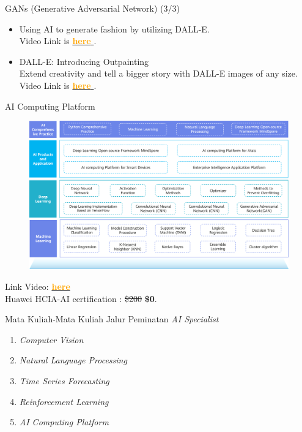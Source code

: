 \documentclass[pdf]{beamer}
\theoremstyle{mystyle}
\begin{document}
\begin{frame}{GANs (Generative Adversarial Network) (3/3)}
	\begin{itemize}
		\item Using AI to generate fashion by utilizing DALL-E. \\
		Video Link is \href{https://drive.google.com/file/d/1xrvBm1TKbGASN8CApdZkgL8sP5aXW2T_/view?usp=sharing}{\textcolor{orange}{\textbf{here}} }.
		
		\bigskip
		\item DALL-E: Introducing Outpainting \\
		Extend creativity and tell a bigger story with DALL-E images of any size. \\
		Video Link is \href{https://drive.google.com/file/d/1mJzmS_tayjQWHqwH9WyqvOdv9NGkOBMs/view?usp=share_link}{\textcolor{orange}{\textbf{here}} }.		
	\end{itemize}	
\end{frame}

\begin{frame}{AI Computing Platform}
	\begin{figure}[!ht]
		\centering
		\includegraphics[scale=.18]{images/peta-topik-huawei-ai}
	\end{figure}				
	Link Video: \href{https://drive.google.com/file/d/1e94HC381qGUsyLEfsxpE5o4btTd59HWZ/view?usp=sharing}{\textcolor{orange}{\textbf{here}}} \\
	Huawei HCIA-AI certification : \st{\$200} \textbf{\$0}.	
\end{frame}



\begin{frame}{Mata Kuliah-Mata Kuliah Jalur Peminatan \textit{AI Specialist}}
	\begin{enumerate}
		\item \textit{Computer Vision}
		\bigskip
		\item \textit{Natural Language Processing}
		\bigskip
		\item \textit{Time Series Forecasting}
		\bigskip
		\item \textit{Reinforcement Learning}
		\bigskip		
		\item \textit{AI Computing Platform}
	\end{enumerate}	
\end{frame}
\end{document}
